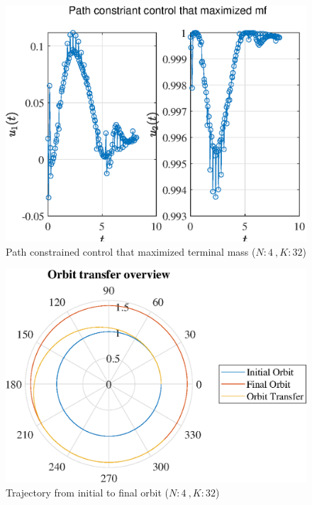 \documentclass[]{article}
\begin{document}
	\begin{figure}
		\centering
		\includegraphics[scale=0.75]{path_N4_K32_C3_mf.eps}
		\caption{Path constrained control that maximized terminal mass (\(N:4\ , K:32\))}
		\label{fig:path_N4_K32_C3_mf}
	\end{figure}
	\begin{figure}
		\centering
		\includegraphics[scale=0.75]{orbit_N4_K32_C3_mf.eps}
		\caption{Trajectory from initial to final orbit (\(N:4\ , K:32\))}
		\label{fig:orbit_N4_K32_C3_mf}
	\end{figure}
\end{document}
